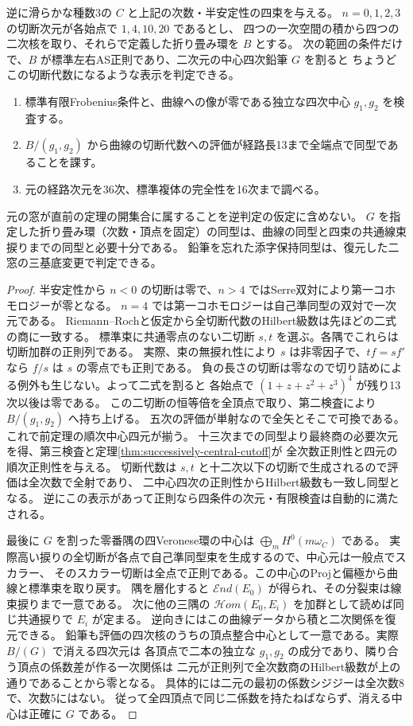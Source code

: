 \begin{proposition}\label{prop:finite-genus-three-curve-recognition}
逆に滑らかな種数3の $C$ と上記の次数・半安定性の四束を与える。
$n=0,1,2,3$ の切断次元が各始点で $1,4,10,20$ であるとし、
四つの一次空間の積から四つの二次核を取り、それらで定義した折り畳み環を $B$ とする。
次の範囲の条件だけで、$B$ が標準左右AS正則であり、二次元の中心四次鉛筆 $G$ を割ると
ちょうどこの切断代数になるような表示を判定できる。
\begin{enumerate}
\item 標準有限Frobenius条件と、曲線への像が零である独立な四次中心 $g_1,g_2$ を検査する。
\item $B/(g_1,g_2)$ から曲線の切断代数への評価が経路長13まで全端点で同型であることを課す。
\item 元の経路次元を36次、標準複体の完全性を16次まで調べる。
\end{enumerate}
元の窓が直前の定理の開集合に属することを逆判定の仮定に含めない。
$G$ を指定した折り畳み環（次数・頂点を固定）の同型は、曲線の同型と四束の共通線束捩りまでの同型と必要十分である。
鉛筆を忘れた添字保持同型は、復元した二窓の三基底変更で判定できる。
\end{proposition}
\begin{proof}
半安定性から $n<0$ の切断は零で、$n>4$ ではSerre双対により第一コホモロジーが零となる。
$n=4$ では第一コホモロジーは自己準同型の双対で一次元である。
Riemann--Rochと仮定から全切断代数のHilbert級数は先ほどの二式の商に一致する。
標準束に共通零点のない二切断 $s,t$ を選ぶ。各隅でこれらは切断加群の正則列である。
実際、束の無捩れ性により $s$ は非零因子で、$tf=sf'$ なら $f/s$ は $s$ の零点でも正則である。
負の長さの切断は零なので切り詰めによる例外も生じない。よって二式を割ると
各始点で $(1+z+z^2+z^3)^4$ が残り13次以後は零である。
この二切断の恒等倍を全頂点で取り、第二検査により $B/(g_1,g_2)$ へ持ち上げる。
五次の評価が単射なので全矢とそこで可換である。これで前定理の順次中心四元が揃う。
十三次までの同型より最終商の必要次元を得、第三検査と定理\ref{thm:successively-central-cutoff}が
全次数正則性と四元の順次正則性を与える。
切断代数は $s,t$ と十二次以下の切断で生成されるので評価は全次数で全射であり、
二中心四次の正則性からHilbert級数も一致し同型となる。
逆にこの表示があって正則なら四条件の次元・有限検査は自動的に満たされる。

最後に $G$ を割った零番隅の四Veronese環の中心は $\bigoplus_m H^0(m\omega_C)$ である。
実際高い捩りの全切断が各点で自己準同型束を生成するので、中心元は一般点でスカラー、
そのスカラー切断は全点で正則である。この中心のProjと偏極から曲線と標準束を取り戻す。
隅を層化すると $\mathcal End(E_0)$ が得られ、その分裂束は線束捩りまで一意である。
次に他の三隅の $\mathcal Hom(E_0,E_i)$ を加群として読めば同じ共通捩りで $E_i$ が定まる。
逆向きにはこの曲線データから積と二次関係を復元できる。
鉛筆も評価の四次核のうちの頂点整合中心として一意である。実際 $B/(G)$ で消える四次元は
各頂点で二本の独立な $g_1,g_2$ の成分であり、隣り合う頂点の係数差が作る一次関係は
二元が正則列で全次数商のHilbert級数が上の通りであることから零となる。
具体的には二元の最初の係数シジジーは全次数8で、次数5にはない。
従って全四頂点で同じ二係数を持たねばならず、消える中心は正確に $G$ である。
\end{proof}
